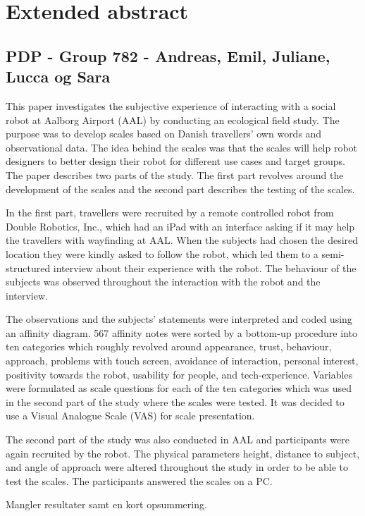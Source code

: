 


\chapter*{Extended abstract}
\label{Abstract}
\section*{PDP - Group 782 - Andreas, Emil, Juliane, Lucca og Sara}
This paper investigates the subjective experience of interacting with a social robot at Aalborg Airport (AAL) by conducting an ecological field study. The purpose was to develop scales based on Danish travellers' own words and observational data. The idea behind the scales was that the scales will help robot designers to better design their robot for different use cases and target groups. The paper describes two parts of the study. The first part revolves around the development of the scales and the second part describes the testing of the scales.

In the first part, travellers were recruited by a remote controlled robot from Double Robotics, Inc., which had an iPad with an interface asking if it may help the travellers with wayfinding at AAL. When the subjects had chosen the desired location they were kindly asked to follow the robot, which led them to a semi-structured interview about their experience with the robot. The behaviour of the subjects was observed throughout the interaction with the robot and the interview. 

The observations and the subjects' statements were interpreted and coded using an affinity diagram. 567 affinity notes were sorted by a bottom-up procedure into ten categories which roughly revolved around appearance, trust, behaviour, approach, problems with touch screen, avoidance of interaction, personal interest, positivity towards the robot, usability for people, and tech-experience.  Variables were formulated as scale questions for each of the ten categories which was used in the second part of the study where the scales were tested. It was decided to use a Visual Analogue Scale (VAS) for scale presentation.

The second part of the study was also conducted in AAL and participants were again recruited by the robot. The physical parameters height, distance to subject, and angle of approach were altered throughout the study in order to be able to test the scales. The participants answered the scales on a PC. 

{\color{red} Mangler resultater samt en kort opsummering.}


